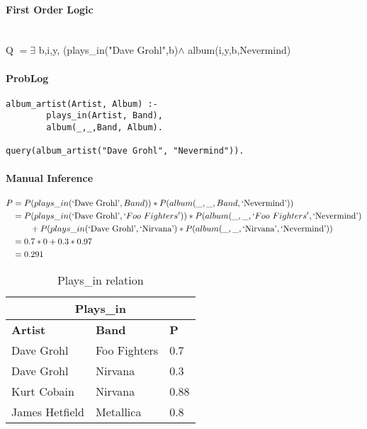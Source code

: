 \documentclass{article}
\begin{document}
\paragraph{First Order Logic} ~\\

Q $= \exists $ b,i,y, (plays\_in("Dave Grohl",b)$ \wedge$ album(i,y,b,Nevermind)

\paragraph{ProbLog}
\begin{verbatim}
album_artist(Artist, Album) :-
        plays_in(Artist, Band),
        album(_,_,Band, Album).
 
query(album_artist("Dave Grohl", "Nevermind")).
\end{verbatim}

\paragraph{Manual Inference}
\begin{equation}
\begin{split}
P & = P(plays\_in(\text{`Dave Grohl'},Band))*P(album(\_,\_,Band,\text{`Nevermind'}))
\\
  & = P(plays\_in(\text{`Dave Grohl'}, `Foo~ Fighters'))*P(album(\_,\_,`Foo~ Fighters',\text{`Nevermind'}) \\& ~~~~~~ + P(plays\_in(\text{`Dave Grohl'}, \text{`Nirvana'})*P(album(\_,\_,\text{`Nirvana'},\text{`Nevermind'}))
 \\ 
 & = 0.7*0 + 0.3*0.97 \\
 & = 0.291
\end{split}
\end{equation}

\begin{table}[]

\centering


\begin{tabular}{lll}
\multicolumn{3}{c}{\textbf{Plays\_in}} \\ \hline
\textbf{Artist}          & \textbf{Band}          & \textbf{P} \\
Dave Grohl      & Foo Fighters  & 0.7  \\
Dave Grohl      & Nirvana       & 0.3  \\
Kurt Cobain     & Nirvana       & 0.88 \\
James Hetfield  & Metallica     & 0.8  \\ \hline
\end{tabular}
\caption{Plays\_in relation}
\label{playsin}
\end{table}
\end{document}
